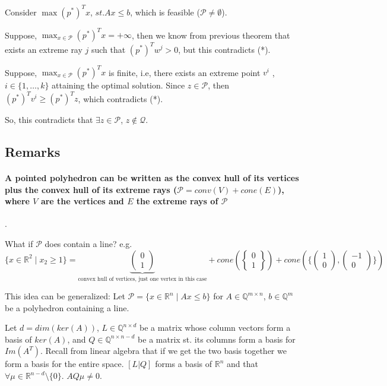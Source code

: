 \documentclass[main]{subfiles}
\begin{document}
Consider $\displaystyle \max (p^*)^T x$, $st. Ax \leq b$, which is feasible ($
\mathcal{P} \neq \emptyset$).

Suppose, $\displaystyle \max_{x \in \mathcal{P}} (p^*)^T x = +\infty$, then we 
know from previous theorem that exists an extreme ray $j$ such that $(p^*)^T 
w^j > 0$, but this contradicts (*).

Suppose, $\displaystyle \max_{x \in \mathcal{P}} (p^*)^T x$ is finite, i.e,
there exists an extreme point $v^i$ , $i \in \{1, \dots, k\}$ attaining the
optimal solution. Since $z \in \mathcal{P}$, then $(p^*)^T v^i \geq (p^*)^T z$,
which contradicts (*).

So, this contradicts that $\exists z \in \mathcal{P}$, $z \notin \mathcal{Q}$.

\subsection{Remarks}

\paragraph{A pointed polyhedron can be written as the convex hull of its
vertices plus the convex hull of its extreme rays ($\mathcal{P} = conv(V) +
cone(E)$), where $V$ are the vertices and $E$ the extreme rays of $\mathcal{P}
$}.

What if $\mathcal{P}$ does contain a line? e.g. $\{x \in \mathbb{R}^2 \mid x_2
\geq 1 \} =
\underbrace{\begin{pmatrix} 0 \\ 1 \end{pmatrix}}_{\text{convex hull of vertices, just one vertex in this case}} + cone (\begin{Bmatrix} 0 \\ 1
\end{Bmatrix}) + cone(\{ \begin{pmatrix} 1 \\ 0
\end{pmatrix}, \begin{pmatrix} -1 \\ 0 \end{pmatrix} \})$

This idea can be generalized: Let $\mathcal{P} = \{x \in \mathbb{R}^n \mid Ax
\leq b \}$ for $A \in \mathbb{Q}^{m \times n}$, $b \in \mathbb{Q}^m$ be a
polyhedron containing a line.

Let $d = dim(ker(A))$, $L \in \mathbb{Q}^{n \times d}$ be a matrix whose column
vectors form a basis of $ker(A)$, and $Q \in \mathbb{Q}^{n \times n-d}$ be a
matrix st. its columns form a basis for $Im(A^T)$. Recall from linear algebra
that if we get the two basis together we form a basis for the entire space.
$[L | Q]$ forms a basis of $\mathbb{R}^n$ and that $\forall \mu \in \mathbb{R}
^{n-d}\setminus \{0\}$. $AQ\mu \neq 0$.\\
\end{document}
